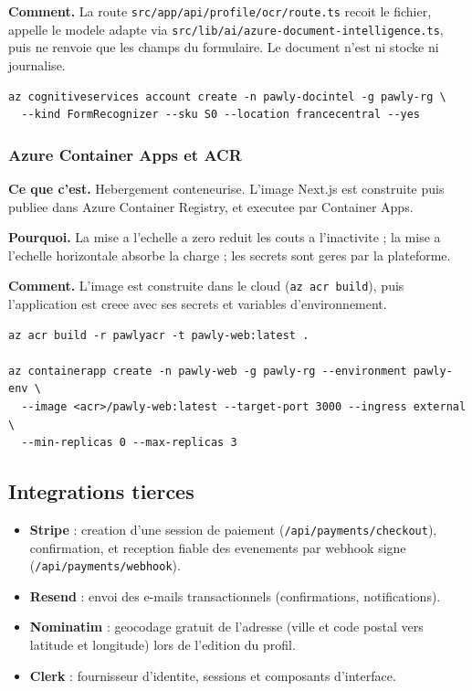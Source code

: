 \documentclass[11pt,a4paper]{article}
\begin{document}
\textbf{Comment.} La route \texttt{src/app/api/profile/ocr/route.ts} recoit le
fichier, appelle le modele adapte via
\texttt{src/lib/ai/azure-document-intelligence.ts}, puis ne renvoie que les
champs du formulaire. Le document n'est ni stocke ni journalise.

\begin{Verbatim}
az cognitiveservices account create -n pawly-docintel -g pawly-rg \
  --kind FormRecognizer --sku S0 --location francecentral --yes
\end{Verbatim}

\subsubsection{Azure Container Apps et ACR}
\textbf{Ce que c'est.} Hebergement conteneurise. L'image Next.js est construite
puis publiee dans Azure Container Registry, et executee par Container Apps.

\textbf{Pourquoi.} La mise a l'echelle a zero reduit les couts a l'inactivite ;
la mise a l'echelle horizontale absorbe la charge ; les secrets sont geres par
la plateforme.

\textbf{Comment.} L'image est construite dans le cloud (\texttt{az acr build}),
puis l'application est creee avec ses secrets et variables d'environnement.

\begin{Verbatim}
az acr build -r pawlyacr -t pawly-web:latest .

az containerapp create -n pawly-web -g pawly-rg --environment pawly-env \
  --image <acr>/pawly-web:latest --target-port 3000 --ingress external \
  --min-replicas 0 --max-replicas 3
\end{Verbatim}

\subsection{Integrations tierces}
\begin{itemize}[leftmargin=1.4em]
  \item \textbf{Stripe} : creation d'une session de paiement (\texttt{/api/payments/checkout}), confirmation, et reception fiable des evenements par webhook signe (\texttt{/api/payments/webhook}).
  \item \textbf{Resend} : envoi des e-mails transactionnels (confirmations, notifications).
  \item \textbf{Nominatim} : geocodage gratuit de l'adresse (ville et code postal vers latitude et longitude) lors de l'edition du profil.
  \item \textbf{Clerk} : fournisseur d'identite, sessions et composants d'interface.
\end{itemize}
\end{document}

